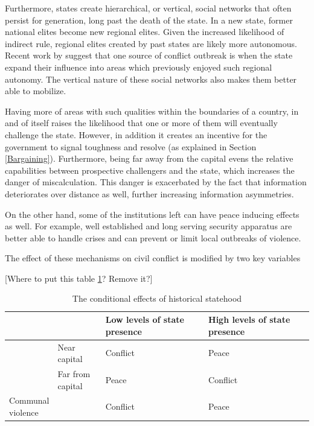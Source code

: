 Furthermore, states create hierarchical, or vertical, social networks that often
persist for generation, long past the death of the state. In a new state, former
national elites become new regional elites. Given the increased likelihood of
indirect rule, regional elites created by past states are likely more
autonomous. Recent work by \citet{Ying_2020} suggest that one source of conflict
outbreak is when the state expand their influence into areas which previously
enjoyed such regional autonomy. The vertical nature of these social networks
also makes them better able to mobilize.

Having more of areas with such qualities within the boundaries of a country, in
and of itself raises the likelihood that one or more of them will eventually
challenge the state. However, in addition it creates an incentive for the
government to signal toughness and resolve (as explained in Section
\ref{Bargaining}). Furthermore, being far away from the capital evens the
relative capabilities between prospective challengers and the state, which
increases the danger of miscalculation. This danger is exacerbated by the fact
that information deteriorates over distance as well, further increasing
information asymmetries.

On the other hand, some of the institutions left can have peace inducing effects
as well. For example, well established and long serving security apparatus are
better able to handle crises and can prevent or limit local outbreaks of
violence.

The effect of these mechanisms on civil conflict is modified by two key
variables

[Where to put this table \ref{Conditional effects}? Remove it?]

\begin{table}[hpbt]
\begin{tabularx}{\textwidth}{>{\centering\arraybackslash}X>{\centering\arraybackslash}X|>{\centering\arraybackslash}X|>{\centering\arraybackslash}X}
    & & {Low levels of state presence} & {High levels of state presence} \\
\midrule
     \multirow{2}{=}{\centering State based violence} & Near capital & Conflict &  Peace \\
     \cmidrule{2-4}
					   & \makecell{Far from \\ capital} & Peace & Conflict \\
\midrule
     \makecell{Communal\\ violence} & & Conflict & Peace \\
\end{tabularx}
\caption{The conditional effects of historical statehood}
\label{Conditional effects}
\end{table}


